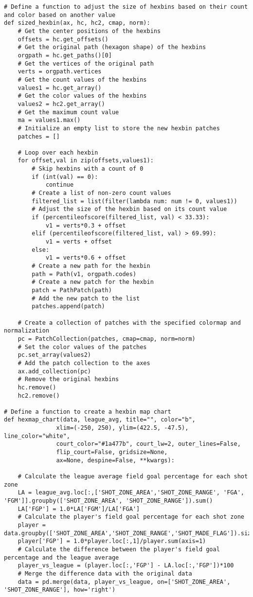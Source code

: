 \begin{verbatim}
# Define a function to adjust the size of hexbins based on their count and color based on another value
def sized_hexbin(ax, hc, hc2, cmap, norm):
    # Get the center positions of the hexbins
    offsets = hc.get_offsets()
    # Get the original path (hexagon shape) of the hexbins
    orgpath = hc.get_paths()[0]
    # Get the vertices of the original path
    verts = orgpath.vertices
    # Get the count values of the hexbins
    values1 = hc.get_array()
    # Get the color values of the hexbins
    values2 = hc2.get_array()
    # Get the maximum count value
    ma = values1.max()
    # Initialize an empty list to store the new hexbin patches
    patches = []

    # Loop over each hexbin
    for offset,val in zip(offsets,values1):
        # Skip hexbins with a count of 0
        if (int(val) == 0):
            continue
        # Create a list of non-zero count values
        filtered_list = list(filter(lambda num: num != 0, values1))
        # Adjust the size of the hexbin based on its count value
        if (percentileofscore(filtered_list, val) < 33.33):
            v1 = verts*0.3 + offset
        elif (percentileofscore(filtered_list, val) > 69.99):
            v1 = verts + offset
        else:
            v1 = verts*0.6 + offset
        # Create a new path for the hexbin
        path = Path(v1, orgpath.codes)
        # Create a new patch for the hexbin
        patch = PathPatch(path)
        # Add the new patch to the list
        patches.append(patch)

    # Create a collection of patches with the specified colormap and normalization
    pc = PatchCollection(patches, cmap=cmap, norm=norm)
    # Set the color values of the patches
    pc.set_array(values2)
    # Add the patch collection to the axes
    ax.add_collection(pc)
    # Remove the original hexbins
    hc.remove()
    hc2.remove()

# Define a function to create a hexbin map chart
def hexmap_chart(data, league_avg, title="", color="b",
               xlim=(-250, 250), ylim=(422.5, -47.5), line_color="white",
               court_color="#1a477b", court_lw=2, outer_lines=False,
               flip_court=False, gridsize=None, 
               ax=None, despine=False, **kwargs):
    
    # Calculate the league average field goal percentage for each shot zone
    LA = league_avg.loc[:,['SHOT_ZONE_AREA','SHOT_ZONE_RANGE', 'FGA', 'FGM']].groupby(['SHOT_ZONE_AREA', 'SHOT_ZONE_RANGE']).sum()
    LA['FGP'] = 1.0*LA['FGM']/LA['FGA']
    # Calculate the player's field goal percentage for each shot zone
    player = data.groupby(['SHOT_ZONE_AREA','SHOT_ZONE_RANGE','SHOT_MADE_FLAG']).size().unstack(fill_value=0)
    player['FGP'] = 1.0*player.loc[:,1]/player.sum(axis=1)
    # Calculate the difference between the player's field goal percentage and the league average
    player_vs_league = (player.loc[:,'FGP'] - LA.loc[:,'FGP'])*100  
    # Merge the difference data with the original data
    data = pd.merge(data, player_vs_league, on=['SHOT_ZONE_AREA', 'SHOT_ZONE_RANGE'], how='right')
    

\end{verbatim}
